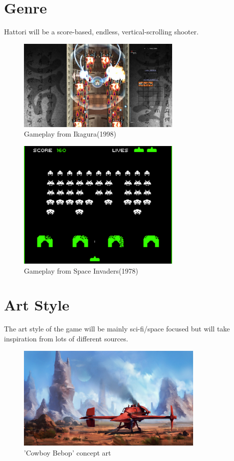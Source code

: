 \documentclass[a4paper]{scrreprt}
\begin{document}
\section{Genre}
Hattori will be a score-based, endless, vertical-scrolling shooter.

\begin{figure}[h]
  \centering
  \includegraphics[width=0.7\textwidth]{IkaguraGameplay}
  \caption{\label{fig:art}Gameplay from Ikagura(1998)}
  \end{figure}

  \begin{figure}[h]
    \centering
    \includegraphics[width=0.7\textwidth]{Invaders}
    \caption{\label{fig:art}Gameplay from Space Invaders(1978)}
    \end{figure}

\clearpage

\section{Art Style}
The art style of the game will be mainly sci-fi/space focused but will take inspiration from lots of different sources. 

\begin{figure}[h]
  \centering
  \includegraphics[width=0.8\textwidth]{Spaceship}
  \caption{'Cowboy Bebop' concept art}
  \end{figure}
\end{document}
